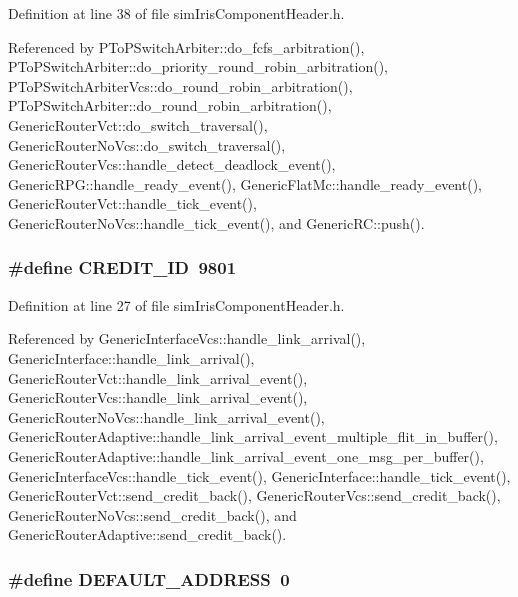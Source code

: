 Definition at line 38 of file simIrisComponentHeader.h.

Referenced by PToPSwitchArbiter::do\_\-fcfs\_\-arbitration(), PToPSwitchArbiter::do\_\-priority\_\-round\_\-robin\_\-arbitration(), PToPSwitchArbiterVcs::do\_\-round\_\-robin\_\-arbitration(), PToPSwitchArbiter::do\_\-round\_\-robin\_\-arbitration(), GenericRouterVct::do\_\-switch\_\-traversal(), GenericRouterNoVcs::do\_\-switch\_\-traversal(), GenericRouterVcs::handle\_\-detect\_\-deadlock\_\-event(), GenericRPG::handle\_\-ready\_\-event(), GenericFlatMc::handle\_\-ready\_\-event(), GenericRouterVct::handle\_\-tick\_\-event(), GenericRouterNoVcs::handle\_\-tick\_\-event(), and GenericRC::push().
\subsubsection[{CREDIT\_\-ID}]{\setlength{\rightskip}{0pt plus 5cm}\#define CREDIT\_\-ID~9801}\label{simIrisComponentHeader_8h_2d879516eff32a88299e25eb5a377fee}




Definition at line 27 of file simIrisComponentHeader.h.

Referenced by GenericInterfaceVcs::handle\_\-link\_\-arrival(), GenericInterface::handle\_\-link\_\-arrival(), GenericRouterVct::handle\_\-link\_\-arrival\_\-event(), GenericRouterVcs::handle\_\-link\_\-arrival\_\-event(), GenericRouterNoVcs::handle\_\-link\_\-arrival\_\-event(), GenericRouterAdaptive::handle\_\-link\_\-arrival\_\-event\_\-multiple\_\-flit\_\-in\_\-buffer(), GenericRouterAdaptive::handle\_\-link\_\-arrival\_\-event\_\-one\_\-msg\_\-per\_\-buffer(), GenericInterfaceVcs::handle\_\-tick\_\-event(), GenericInterface::handle\_\-tick\_\-event(), GenericRouterVct::send\_\-credit\_\-back(), GenericRouterVcs::send\_\-credit\_\-back(), GenericRouterNoVcs::send\_\-credit\_\-back(), and GenericRouterAdaptive::send\_\-credit\_\-back().
\subsubsection[{DEFAULT\_\-ADDRESS}]{\setlength{\rightskip}{0pt plus 5cm}\#define DEFAULT\_\-ADDRESS~0}\label{simIrisComponentHeader_8h_838ee749ec1dfd8d73187bb32e9ec427}





